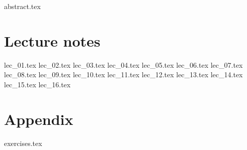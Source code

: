 \documentclass[fancyfoot, git]{mkessler-script}
\author{Simon Cyrani}
\begin{document}
\maketitle

{abstract.tex}

\cleardoublepage
\tableofcontents

\cleardoublepage
\summaryoflectures

\cleardoublepage
\part{Lecture notes}
{lec_01.tex}
{lec_02.tex}
{lec_03.tex}
{lec_04.tex}
{lec_05.tex}
{lec_06.tex}
{lec_07.tex}
{lec_08.tex}
{lec_09.tex}
{lec_10.tex}
{lec_11.tex}
{lec_12.tex}
{lec_13.tex}
{lec_14.tex}
{lec_15.tex}
{lec_16.tex}


\cleardoublepage
\appendix
\part{Appendix}

{exercises.tex}

\cleardoublepage

\cleardoublepage
\printvocabindex

\cleardoublepage
\printimageattributions

\cleardoublepage
\printliterature
\end{document}
